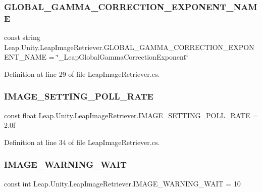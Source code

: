 \subsubsection{\texorpdfstring{GLOBAL\_GAMMA\_CORRECTION\_EXPONENT\_NAME}{GLOBAL\_GAMMA\_CORRECTION\_EXPONENT\_NAME}}
{\footnotesize\ttfamily const string Leap.\+Unity.\+Leap\+Image\+Retriever.\+G\+L\+O\+B\+A\+L\+\_\+\+G\+A\+M\+M\+A\+\_\+\+C\+O\+R\+R\+E\+C\+T\+I\+O\+N\+\_\+\+E\+X\+P\+O\+N\+E\+N\+T\+\_\+\+N\+A\+ME = \char`\"{}\+\_\+\+Leap\+Global\+Gamma\+Correction\+Exponent\char`\"{}}



Definition at line 29 of file Leap\+Image\+Retriever.\+cs.

\mbox{\label{class_leap_1_1_unity_1_1_leap_image_retriever_a4c831095b914ffd0b0d7508886a53778}} 
\subsubsection{\texorpdfstring{IMAGE\_SETTING\_POLL\_RATE}{IMAGE\_SETTING\_POLL\_RATE}}
{\footnotesize\ttfamily const float Leap.\+Unity.\+Leap\+Image\+Retriever.\+I\+M\+A\+G\+E\+\_\+\+S\+E\+T\+T\+I\+N\+G\+\_\+\+P\+O\+L\+L\+\_\+\+R\+A\+TE = 2.\+0f}



Definition at line 34 of file Leap\+Image\+Retriever.\+cs.

\mbox{\label{class_leap_1_1_unity_1_1_leap_image_retriever_a7e3710c0ed8c4f9d0247a562e61cf69a}} 
\subsubsection{\texorpdfstring{IMAGE\_WARNING\_WAIT}{IMAGE\_WARNING\_WAIT}}
{\footnotesize\ttfamily const int Leap.\+Unity.\+Leap\+Image\+Retriever.\+I\+M\+A\+G\+E\+\_\+\+W\+A\+R\+N\+I\+N\+G\+\_\+\+W\+A\+IT = 10}



